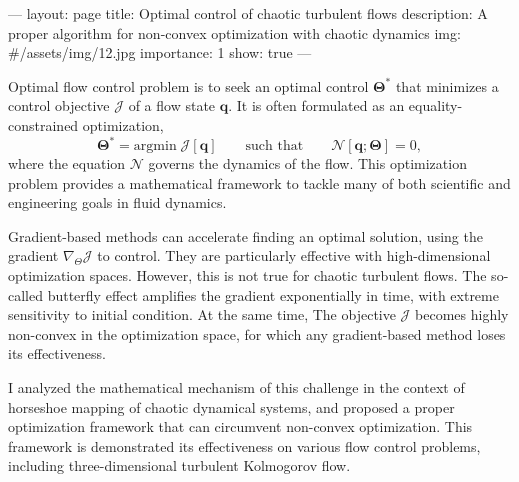 ---
layout: page
title: Optimal control of chaotic turbulent flows
description: A proper algorithm for non-convex optimization with chaotic dynamics
img: #/assets/img/12.jpg
importance: 1
show: true
---

Optimal flow control problem is
to seek an optimal control $\mathbf{\Theta}^{\ast}$
that minimizes a control objective $\mathcal{J}$ of a flow state $\mathbf{q}$.
It is often formulated as an equality-constrained optimization,
\begin{equation*}
\mathbf{\Theta}^{\ast} = \mathrm{argmin}\;\mathcal{J}[\mathbf{q}]
\qquad
\text{such that}
\qquad
\mathcal{N}[\mathbf{q};\mathbf{\Theta}] = 0,
\end{equation*}
where the equation $\mathcal{N}$ governs the dynamics of the flow.
This optimization problem provides a mathematical framework
to tackle many of both scientific and engineering goals in fluid dynamics.
\par
Gradient-based methods can accelerate finding an optimal solution,
using the gradient $\nabla_{\Theta}\mathcal{J}$ to control.
They are particularly effective with high-dimensional optimization spaces.
However, this is not true for chaotic turbulent flows.
The so-called butterfly effect amplifies the gradient exponentially in time,
with extreme sensitivity to initial condition.
At the same time,
The objective $\mathcal{J}$ becomes highly non-convex in the optimization space,
for which any gradient-based method loses its effectiveness.
\par
I analyzed the mathematical mechanism of this challenge
in the context of horseshoe mapping of chaotic dynamical systems,
and proposed a proper optimization framework that can circumvent non-convex optimization.
This framework is demonstrated its effectiveness on various flow control problems,
including three-dimensional turbulent Kolmogorov flow.
